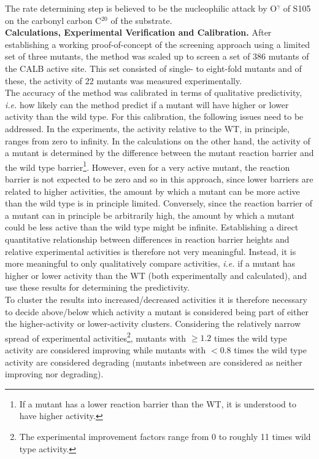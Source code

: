 The rate determining step is believed to be the nucleophilic attack by O$^\gamma$ of S105 on the carbonyl carbon C$^{20}$ of the substrate.\\
\textbf{Calculations, Experimental Verification and Calibration.}
After establishing a working proof-of-concept of the screening approach using a limited set of three mutants\cite{10.1371/journal.pone.0049849}, the method was scaled up to screen a set of 386 mutants of the CALB active site\cite{hediger2013silico}.
This set consisted of single- to eight-fold mutants and of these, the activity of 22 mutants was measured experimentally.\\
The accuracy of the method was calibrated in terms of qualitative predictivity, \textit{i.e.} how likely can the method predict if a mutant will have higher or lower activity than the wild type.
For this calibration, the following issues need to be addressed.
In the experiments, the activity relative to the WT, in principle, ranges from zero to infinity.
In the calculations on the other hand, the activity of a mutant is determined by the difference between the mutant reaction barrier and the wild type barrier\footnote{If a mutant has a lower reaction barrier than the WT, it is understood to have higher activity.}.
However, even for a very active mutant, the reaction barrier is not expected to be zero and so in this approach, since lower barriers are related to higher activities, the amount by which a mutant can be more active than the wild type is in principle limited.
Conversely, since the reaction barrier of a mutant can in principle be arbitrarily high, the amount by which a mutant could be less active than the wild type might be infinite.
Establishing a direct quantitative relationship between differences in reaction barrier heights and relative experimental activities is therefore not very meaningful.
Instead, it is more meaningful to only qualitatively compare activities, \textit{i.e.} if a mutant has higher or lower activity than the WT (both experimentally and calculated), and use these results for determining the predictivity.\\
To cluster the results into increased/decreased activities it is therefore necessary to decide above/below which activity a mutant is considered being part of either the higher-activity or lower-activity clusters.
Considering the relatively narrow spread of experimental activities\footnote{The experimental improvement factors range from 0 to roughly 11 times wild type activity.}, mutants with $\geq1.2$ times the wild type activity are considered improving while mutants with $<0.8$ times the wild type activity are considered degrading (mutants inbetween are considered as neither improving nor degrading)\cite{hediger2013silico}.
